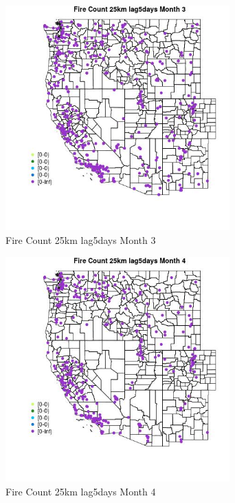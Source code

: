 \begin{figure} 
\centering  
\includegraphics[width=0.77\textwidth]{Code_Outputs/Report_ML_input_PM25_Step4_part_e_de_duplicated_aves_compiled_2019-05-18wNAs_MapObsMo3Fire_Count_25km_lag5days.jpg} 
\caption{\label{fig:Report_ML_input_PM25_Step4_part_e_de_duplicated_aves_compiled_2019-05-18wNAsMapObsMo3Fire_Count_25km_lag5days}Fire Count 25km lag5days Month 3} 
\end{figure} 
 

\begin{figure} 
\centering  
\includegraphics[width=0.77\textwidth]{Code_Outputs/Report_ML_input_PM25_Step4_part_e_de_duplicated_aves_compiled_2019-05-18wNAs_MapObsMo4Fire_Count_25km_lag5days.jpg} 
\caption{\label{fig:Report_ML_input_PM25_Step4_part_e_de_duplicated_aves_compiled_2019-05-18wNAsMapObsMo4Fire_Count_25km_lag5days}Fire Count 25km lag5days Month 4} 
\end{figure} 
 


